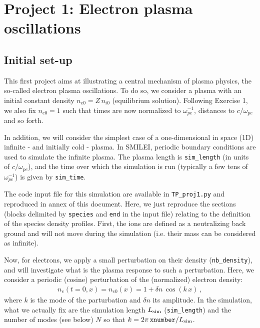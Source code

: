 \documentclass[11pt,a4paper]{article}
\begin{document}
\newpage
\section*{Project 1: Electron plasma oscillations}\label{proj1}

\subsection*{Initial set-up}

This first project aims at illustrating a central mechanism of plasma physics, the so-called electron plasma oscillations.
To do so, we consider a plasma with an initial  constant density $n_{e0} = Z\,n_{i0}$ (equilibrium solution).
Following Exercise 1, we also fix $n_{e0}=1$ such that times are now normalized to $\omega_{pe}^{-1}$, distances to $c/\omega_{pe}$ and so forth.

In addition, we will consider the simplest case of a one-dimensional in space (1D) infinite - and initially cold - plasma.
In SMILEI, periodic boundary conditions are used to simulate the infinite plasma.
The plasma length is \texttt{sim\_length}  (in units of $c/\omega_{pe}$), and the time over which the simulation is run (typically a few tens of $\omega_{pe}^{-1}$) is given by \texttt{sim\_time}. 

The code input file for this simulation are available in \texttt{TP\_proj1.py} and reproduced in annex of this document.
Here, we just reproduce the sections (blocks delimited by \texttt{species} and \texttt{end} in the input file) relating to the definition of the species density profiles. 
First, the ions are defined as a neutralizing back ground and will not move during the simulation (i.e. their mass can be considered as infinite).




Now, for electrons, we apply a small perturbation on their density (\texttt{nb\_density}), and will investigate what is the plasma response to such a perturbation.
Here, we consider a periodic (cosine) perturbation of the (normalized) electron density:
\begin{eqnarray}\label{eq_pert}
n_e(t=0,x) = n_{e0}(x) = 1 + \delta n\,\cos(k\,x)\,,
\end{eqnarray}
where $k$ is the mode of the parturbation and $\delta n$ its amplitude. 
In the simulation, what we actually fix are the simulation length $L_{\rm sim}$ (\texttt{sim\_length}) and the number of modes (see below) $N$ so that $k=2\pi\,\mathtt{xnumber}/L_{\rm sim}$.
\end{document}
